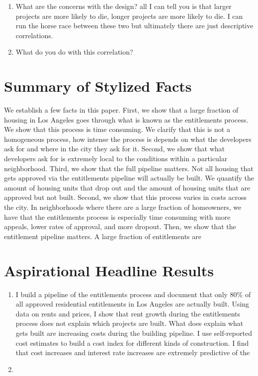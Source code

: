 \documentclass[12pt]{article}
\theoremstyle{definition}
\begin{document}
\begin{enumerate}
    \item What are the concerns with the design? all I can tell you is that larger projects are more likely to die, longer projects are more likely to die. I can run the horse race between these two but ultimately there are just descriptive correlations. 
    \item What do you do with this correlation? 
\end{enumerate}


\section{Summary of Stylized Facts}
We establish a few facts in this paper.
First, we show that a large fraction of housing in Los Angeles goes through what is known as the entitlements process. We show that this process is time consuming. We clarify that this is not a homogeneous process, how intense the process is depends on what the developers ask for and where in the city they ask for it. 
Second, we show that what developers ask for is extremely local to the conditions within a particular neighborhood.
Third, we show that the full pipeline matters. Not all housing that gets approved via the entitlements pipeline will actually be built. We quantify the amount of housing units that drop out and the amount of housing units that are approved but not built. 
Second, we show that this process varies in costs across the city. In neighborhoods where there are a large fraction of homeowners, we have that the entitlements process is especially time consuming with more appeals, lower rates of approval, and more dropout. 
Then, we show that the entitlement pipeline matters. A large fraction of entitlements are 

\section{Aspirational Headline Results}
\begin{enumerate}
   \item I build a pipeline of the entitlements process and document that only 80\% of all approved residential entitlements in Los Angeles are actually built. Using data on rents and prices, I show that rent growth during the entitlements process does not explain which projects are built. What does explain what gets built are increasing costs during the building pipeline. I use self-reported cost estimates to build a cost index for different kinds of construction. I find that cost increases and interest rate increases are extremely predictive of the 
   \item 
\end{enumerate}
\end{document}

